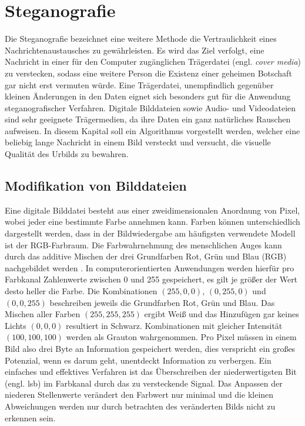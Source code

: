 \chapter{Steganografie}
Die Steganografie bezeichnet eine weitere Methode die Vertraulichkeit eines
Nachrichtenaustausches zu gewährleisten.
Es wird das Ziel verfolgt, eine Nachricht in einer für den Computer
zugänglichen Trägerdatei (engl. \textit{cover media}) zu verstecken, sodass eine
weitere Person die Existenz
einer geheimen Botschaft gar nicht erst vermuten würde. Eine Trägerdatei, unempfindlich
gegenüber kleinen Änderungen in den Daten eignet sich besonders gut für die
Anwendung steganografischer Verfahren. Digitale Bilddateien sowie Audio- und Videodateien
sind sehr geeignete Trägermedien,
da ihre Daten ein ganz natürliches Rauschen aufweisen.
In diesem Kapital soll ein Algorithmus vorgestellt werden, welcher
eine beliebig lange Nachricht in einem Bild versteckt und versucht,
die visuelle Qualität des Urbilds zu bewahren.

\section{Modifikation von Bilddateien}
Eine digitale Bilddatei besteht aus einer zweidimensionalen Anordnung von Pixel, wobei
jeder eine bestimmte Farbe annehmen kann. Farben können unterschiedlich
dargestellt werden, dass in der Bildwiedergabe am häufigsten verwendete Modell ist
der RGB-Farbraum. Die Farbwahrnehmung des menschlichen Auges kann durch
das additive Mischen der drei Grundfarben Rot, Grün und Blau (RGB)
nachgebildet werden \parencite[32-40]{BOOK:VC}. In computerorientierten Anwendungen
werden hierfür pro Farbkanal Zahlenwerte zwischen 0 und 255 gespeichert,
es gilt je größer der Wert desto heller die Farbe. Die Kombinationen
$(255,0,0)$, $(0,255,0)$ und $(0,0,255)$ beschreiben jeweils die Grundfarben Rot, Grün und Blau.
Das Mischen aller Farben $(255,255,255)$ ergibt Weiß und das Hinzufügen gar keines
Lichts $(0,0,0)$ resultiert in Schwarz. Kombinationen mit gleicher Intensität
$(100,100,100)$ werden als Grauton wahrgenommen. Pro Pixel müssen in einem Bild
also drei Byte an Information gespeichert werden, dies verspricht ein großes
Potenzial, wenn es darum geht, unentdeckt Information zu verbergen. Ein
einfaches und effektives Verfahren ist das Überschreiben der niederwertigsten
Bit (engl. \ac{lsb}) im Farbkanal
durch das zu versteckende Signal. Das Anpassen
der niederen Stellenwerte verändert den Farbwert nur minimal und
die kleinen Abweichungen werden nur durch betrachten des veränderten Bilds
nicht zu erkennen sein.

